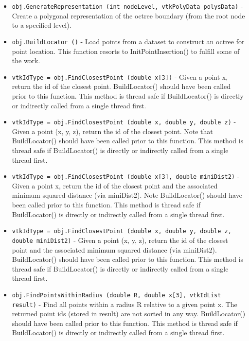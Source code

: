 \begin{itemize}
\item  \verb|obj.GenerateRepresentation (int nodeLevel, vtkPolyData polysData)| -  Create a polygonal representation of the octree boundary (from the root
 node to a specified level).

\item  \verb|obj.BuildLocator ()| -  Load points from a dataset to construct an octree for point location. 
 This function resorts to InitPointInsertion() to fulfill some of the work.

\item  \verb|vtkIdType = obj.FindClosestPoint (double x[3])| -  Given a point x, return the id of the closest point. BuildLocator() should
 have been called prior to this function. This method is thread safe if 
 BuildLocator() is directly or indirectly called from a single thread first.

\item  \verb|vtkIdType = obj.FindClosestPoint (double x, double y, double z)| -  Given a point (x, y, z), return the id of the closest point. Note that
 BuildLocator() should have been called prior to this function. This method
 is thread safe if BuildLocator() is directly or indirectly called from a 
 single thread first.

\item  \verb|vtkIdType = obj.FindClosestPoint (double x[3], double miniDist2)| -  Given a point x, return the id of the closest point and the associated
 minimum squared distance (via miniDist2). Note BuildLocator() should have
 been called prior to this function. This method is thread safe if 
 BuildLocator() is directly or indirectly called from a single thread first.

\item  \verb|vtkIdType = obj.FindClosestPoint (double x, double y, double z, double miniDist2)| -  Given a point (x, y, z), return the id of the closest point and the
 associated minimum squared distance (via miniDist2). BuildLocator() should
 have been called prior to this function. This method is thread safe if 
 BuildLocator() is directly or indirectly called from a single thread first.

\item  \verb|obj.FindPointsWithinRadius (double R, double x[3], vtkIdList result)| -  Find all points within a radius R relative to a given point x. The returned
 point ids (stored in result) are not sorted in any way. BuildLocator() should
 have been called prior to this function. This method is thread safe if 
 BuildLocator() is directly or indirectly called from a single thread first.


\end{itemize}
